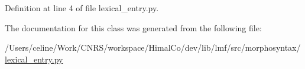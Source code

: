 Definition at line 4 of file lexical\+\_\+entry.\+py.



The documentation for this class was generated from the following file\+:\begin{DoxyCompactItemize}
\item 
/\+Users/celine/\+Work/\+C\+N\+R\+S/workspace/\+Himal\+Co/dev/lib/lmf/src/morphosyntax/\hyperlink{morphosyntax_2lexical__entry_8py}{lexical\+\_\+entry.\+py}\end{DoxyCompactItemize}
